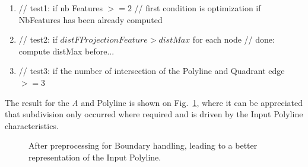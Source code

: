 \documentclass[10pt]{article}
\begin{document}
\begin{enumerate}
\item        // test1: if nb Features $>= 2$
        // first condition is optimization if NbFeatures has been already computed
\item        // test2: if $distFProjectionFeature > distMax$ for each node
        // done: compute distMax before...
\item        // test3: if the number of intersection of the Polyline and Quadrant edge $>= 3$
\end{enumerate}
The result for the \textit{A} and  Polyline is shown on Fig.~\ref{fig:boundary}, where it can be appreciated that subdivision only occurred where required and is driven by the Input Polyline characteristics.

 \begin{figure}[htb]
\centering
\caption{After preprocessing for Boundary handling, leading to a better representation of the Input Polyline.}
\label{fig:boundary}
\end{figure}
\end{document}
